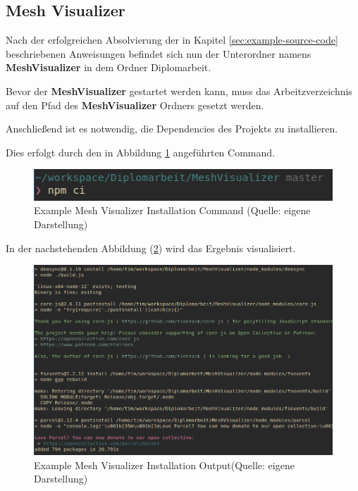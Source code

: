\subsection{Mesh Visualizer}\label{sec:example-mesh-visualizer}

Nach der erfolgreichen Absolvierung der in Kapitel \ref{sec:example-source-code} beschriebenen Anweisungen befindet sich nun der Unterordner namens \textbf{MeshVisualizer} in dem Ordner Diplomarbeit.

Bevor der \textbf{MeshVisualizer} gestartet werden kann, muss das Arbeitzverzeichnis auf den Pfad des \textbf{MeshVisualizer} Ordners gesetzt werden.

Anschließend ist es notwendig, die Dependencies des Projekts zu installieren.

Dies erfolgt durch den in Abbildung \ref{abb:example_mesh_visualizer_installation_cmd} angeführten Command.

\begin{figure}[H]
    \begin{center}
        \includegraphics[scale=1]{images/example_mesh_visualizer_installation_cmd.png}
        \caption{Example Mesh Visualizer Installation Command (Quelle: eigene Darstellung)}
        \label{abb:example_mesh_visualizer_installation_cmd}
    \end{center}
\end{figure}

\pagebreak
In der nachstehenden Abbildung (\ref{abb:example_mesh_visualizer_installation_output}) wird das Ergebnis visualisiert.

\begin{figure}[H]
    \begin{center}
        \includegraphics[scale=.6]{images/example_mesh_visualizer_installation_output.png}
        \caption{Example Mesh Visualizer Installation Output(Quelle: eigene Darstellung)}
        \label{abb:example_mesh_visualizer_installation_output}
    \end{center}
\end{figure}


